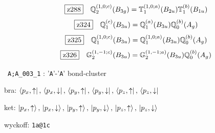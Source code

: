 \documentclass[fleqn,10pt,landscape]{jsarticle}
\begin{document}
\begin{dmath*}
\hspace*{3mm}\fbox{z288}\quad \mathbb{Q}_{2}^{(1,0;c)}(B_{3g})=\mathbb{T}_{1}^{(1,0;a)}(B_{2u}) \mathbb{T}_{1}^{(b)}(B_{1u})
\end{dmath*}
\begin{dmath*}
\hspace*{3mm}\fbox{z324}\quad \mathbb{Q}_{1}^{(c)}(B_{3u})=\mathbb{Q}_{1}^{(a)}(B_{3u}) \mathbb{Q}_{0}^{(b)}(A_{g})
\end{dmath*}
\begin{dmath*}
\hspace*{3mm}\fbox{z325}\quad \mathbb{Q}_{1}^{(1,0;c)}(B_{3u})=\mathbb{Q}_{1}^{(1,0;a)}(B_{3u}) \mathbb{Q}_{0}^{(b)}(A_{g})
\end{dmath*}
\begin{dmath*}
\hspace*{3mm}\fbox{z326}\quad \mathbb{G}_{2}^{(1,-1;c)}(B_{3u})=\mathbb{G}_{2}^{(1,-1;a)}(B_{3u}) \mathbb{Q}_{0}^{(b)}(A_{g})
\end{dmath*}
\vspace{5mm}

\noindent\textbullet\, \texttt{A;A_003_1} : '\texttt{A}'-'\texttt{A}' bond-cluster

\noindent\quad * bra: $\bra{p_{x},\uparrow},\, \bra{p_{x},\downarrow},\, \bra{p_{y},\uparrow},\, \bra{p_{y},\downarrow},\, \bra{p_{z},\uparrow},\, \bra{p_{z},\downarrow}$

\noindent\quad * ket: $\ket{p_{x},\uparrow},\, \ket{p_{x},\downarrow},\, \ket{p_{y},\uparrow},\, \ket{p_{y},\downarrow},\, \ket{p_{z},\uparrow},\, \ket{p_{z},\downarrow}$

\noindent\quad * wyckoff: \texttt{1a@1c}
\end{document}
